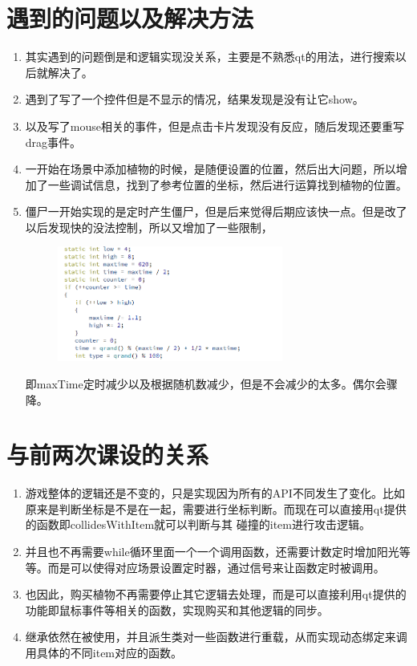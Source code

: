 \documentclass[12pt,a4paper,UTF8]{article}
\begin{document}
\section{遇到的问题以及解决方法}
\begin{enumerate}
  \item 其实遇到的问题倒是和逻辑实现没关系，主要是不熟悉qt的用法，进行搜索以后就解决了。
  \item 遇到了写了一个控件但是不显示的情况，结果发现是没有让它show。
  \item 以及写了mouse相关的事件，但是点击卡片发现没有反应，随后发现还要重写drag事件。
  \item 一开始在场景中添加植物的时候，是随便设置的位置，然后出大问题，所以增加了一些调试信息，找到了参考位置的坐标，然后进行运算找到植物的位置。
  \item 僵尸一开始实现的是定时产生僵尸，但是后来觉得后期应该快一点。但是改了以后发现快的没法控制，所以又增加了一些限制，
  \begin{figure}[H]
    \centering
  \includegraphics[width=0.7\textwidth]{figure/time.png}
  \end{figure}  
  即maxTime定时减少以及根据随机数减少，但是不会减少的太多。偶尔会骤降。
\end{enumerate}

\section{与前两次课设的关系}
\begin{enumerate}
  \item 游戏整体的逻辑还是不变的，只是实现因为所有的API不同发生了变化。比如原来是判断坐标是不是在一起，需要进行坐标判断。而现在可以直接用qt提供的函数即collidesWithItem就可以判断与其
  碰撞的item进行攻击逻辑。
  \item 并且也不再需要while循环里面一个一个调用函数，还需要计数定时增加阳光等等。而是可以使得对应场景设置定时器，通过信号来让函数定时被调用。
  \item 也因此，购买植物不再需要停止其它逻辑去处理，而是可以直接利用qt提供的功能即鼠标事件等相关的函数，实现购买和其他逻辑的同步。
  \item 继承依然在被使用，并且派生类对一些函数进行重载，从而实现动态绑定来调用具体的不同item对应的函数。
\end{enumerate}
\end{document}

